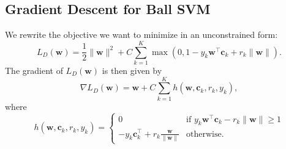 \documentclass[12pt]{article}
\newcommand{\bc}{\mathbf{c}}
\newcommand{\bw}{\mathbf{w}}
\newcommand{\tx}{\tilde{x}}
\begin{document}
\subsection{Gradient Descent for Ball SVM}
We rewrite the objective we want to minimize in an unconstrained form:
\begin{equation}
L_D(\bw) = \frac{1}{2}\|\bw\|^2 + C\sum_{k=1}^K\max(0, 1 - y_k\bw^{\top}\bc_k + r_k\| \bw \|).
\end{equation}
The gradient of $L_D(\bw)$ is then given by
$$
\nabla L_D(\bw) = \bw + C\sum_{k=1}^K h(\bw, \bc_k, r_k, y_k),
$$
where
$$
h(\bw, \bc_k, r_k, y_k) = 
  \begin{cases}
   0 & \text{if } y_k\bw^{\top}\bc_k - r_k\| \bw \| \ge 1  \\
   -y_k\bc_k^{\top} + r_k\frac{\bw}{\|\bw\|} & \text{otherwise}.
  \end{cases}
$$

\end{document}
